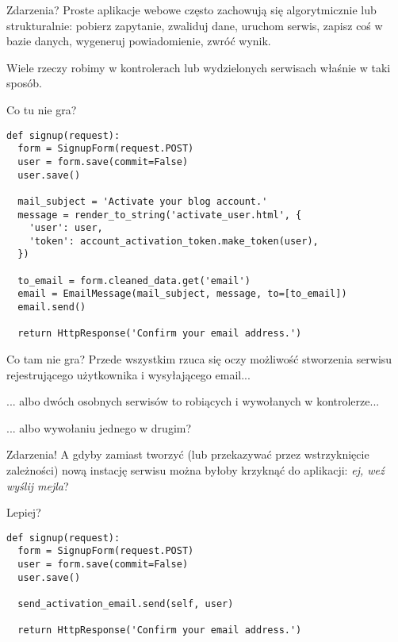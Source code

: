 \begin{frame}{Zdarzenia?}
	Proste aplikacje webowe często zachowują się algorytmicznie lub strukturalnie: pobierz zapytanie, zwaliduj dane, uruchom serwis, zapisz coś w bazie danych, wygeneruj powiadomienie, zwróć wynik. 
	
	Wiele rzeczy robimy w kontrolerach lub wydzielonych serwisach właśnie w taki sposób. 
\end{frame}

\begin{frame}[fragile]{Co tu nie gra?}
\begin{lstlisting}
def signup(request):
  form = SignupForm(request.POST)
  user = form.save(commit=False)
  user.save()

  mail_subject = 'Activate your blog account.'
  message = render_to_string('activate_user.html', {
    'user': user,
    'token': account_activation_token.make_token(user),
  })

  to_email = form.cleaned_data.get('email')
  email = EmailMessage(mail_subject, message, to=[to_email])
  email.send()
  
  return HttpResponse('Confirm your email address.')
\end{lstlisting}
\end{frame}

\begin{frame}{Co tam nie gra?}
	Przede wszystkim rzuca się oczy możliwość stworzenia serwisu rejestrującego użytkownika i wysyłającego email...
	
	... albo dwóch osobnych serwisów to robiących i wywołanych w kontrolerze...
	
	... albo wywołaniu jednego w drugim?
\end{frame}

\begin{frame}{Zdarzenia!}
	A gdyby zamiast tworzyć (lub przekazywać przez wstrzyknięcie zależności) nową instację serwisu można byłoby krzyknąć do aplikacji: \emph{ej, weź wyślij mejla}?
\end{frame}

\begin{frame}[fragile]{Lepiej?}
\begin{lstlisting}
def signup(request):
  form = SignupForm(request.POST)
  user = form.save(commit=False)
  user.save()

  send_activation_email.send(self, user)
  
  return HttpResponse('Confirm your email address.')
\end{lstlisting}
\end{frame}

